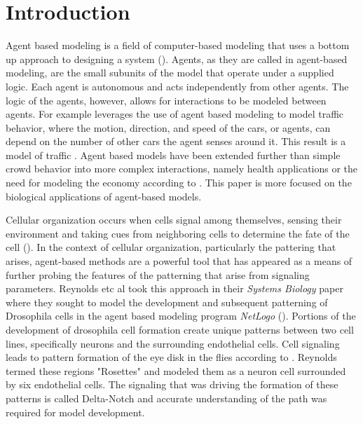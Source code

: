 \documentclass[12pt]{ifacconf}
\begin{document}
\section{Introduction}
Agent based modeling is a field of computer-based modeling that uses a bottom up approach to designing a system (\cite{Bon:02}). Agents, as they are called in agent-based modeling, are the small subunits of the model that operate under a supplied logic. Each agent is autonomous and acts independently from other agents. The logic of the agents, however, allows for interactions to be modeled between agents. For example \citet{DB:08} leverages the use of agent based modeling to model traffic behavior, where the motion, direction, and speed of the cars, or agents, can depend on the number of other cars the agent senses around it. This result is a model of traffic \cite{DB:08}. Agent based models have been extended further than simple crowd behavior into more complex interactions, namely health applications or the need for modeling the economy according to \cite{FE:09}. This paper is more focused on the biological applications of agent-based models.

Cellular organization occurs when cells signal among themselves, sensing their environment and taking cues from neighboring cells to determine the fate of the cell (\cite{KI:93}). In the context of cellular organization, particularly the pattering that arises, agent-based methods are a powerful tool that has appeared as a means of further probing the features of the patterning that arise from signaling parameters. Reynolds etc al took this approach in their \emph{Systems Biology} paper where they sought to model the development and subsequent patterning of Drosophila cells in the agent based modeling program \emph{NetLogo} (\cite{RAB:19}). Portions of the development of drosophila cell formation create unique patterns between two cell lines, specifically neurons and the surrounding endothelial cells. Cell signaling leads to pattern formation of the eye disk in the flies according to \cite{KI:93}. Reynolds termed these regions "Rosettes" and modeled them as a neuron cell surrounded by six endothelial cells. The signaling that was driving the formation of these patterns is called Delta-Notch and accurate understanding of the path was required for model development. 
\end{document}
